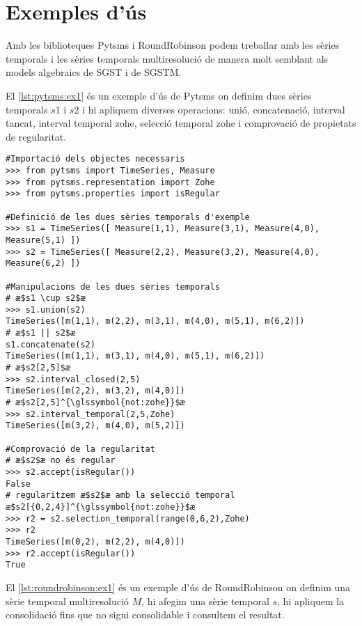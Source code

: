 \section{Exemples d'ús}


Amb les biblioteques Pytsms i RoundRobinson podem treballar amb les
sèries temporals i les sèries temporals multiresolució de manera molt
semblant als models algebraics de \gls{SGST} i de \gls{SGSTM}.




El \autoref{lst:pytsms:ex1} és un exemple d'ús de Pytsms on
definim dues sèries temporals $s1$ i $s2$ i hi apliquem diverses
operacions: unió, concatenació, interval tancat, interval temporal
\gls{zohe}, selecció temporal \gls{zohe} i comprovació de propietats de
regularitat.

\begin{lstlisting}[style=py,caption=Exemple d'operacions amb Pytsms,label=lst:pytsms:ex1]
#Importació dels objectes necessaris
>>> from pytsms import TimeSeries, Measure
>>> from pytsms.representation import Zohe
>>> from pytsms.properties import isRegular

#Definició de les dues sèries temporals d'exemple
>>> s1 = TimeSeries([ Measure(1,1), Measure(3,1), Measure(4,0), Measure(5,1) ])
>>> s2 = TimeSeries([ Measure(2,2), Measure(3,2), Measure(4,0), Measure(6,2) ])

#Manipulacions de les dues sèries temporals
# æ$s1 \cup s2$æ
>>> s1.union(s2)
TimeSeries([m(1,1), m(2,2), m(3,1), m(4,0), m(5,1), m(6,2)])
# æ$s1 || s2$æ
s1.concatenate(s2) 
TimeSeries([m(1,1), m(3,1), m(4,0), m(5,1), m(6,2)])
# æ$s2[2,5]$æ
>>> s2.interval_closed(2,5)
TimeSeries([m(2,2), m(3,2), m(4,0)])
# æ$s2[2,5]^{\glssymbol{not:zohe}}$æ
>>> s2.interval_temporal(2,5,Zohe)
TimeSeries([m(3,2), m(4,0), m(5,2)])

#Comprovació de la regularitat
# æ$s2$æ no és regular
>>> s2.accept(isRegular())
False
# regularitzem æ$s2$æ amb la selecció temporal æ$s2[{0,2,4}]^{\glssymbol{not:zohe}}$æ
>>> r2 = s2.selection_temporal(range(0,6,2),Zohe)
>>> r2
TimeSeries([m(0,2), m(2,2), m(4,0)])
>>> r2.accept(isRegular())
True
\end{lstlisting}




El \autoref{lst:roundrobinson:ex1} és un exemple d'ús de RoundRobinson
on definim una sèrie temporal multiresolució $M$, hi afegim una sèrie
temporal $s$, hi apliquem la consolidació fins que no sigui
consolidable i consultem el resultat.

